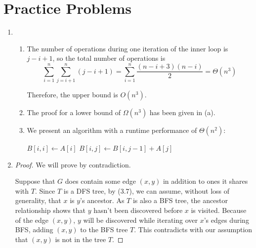 \documentclass{article}
\begin{document}
\section{Practice Problems}

\begin{enumerate}
    \item
    \begin{enumerate}
        \item The number of operations during one iteration of the inner loop is $j - i + 1$, so the total number of operations is
        \[
            \sum_{i = 1}^n \sum_{j = i + 1}^n (j - i + 1) = \sum_{i = 1}^n \frac{(n - i + 3)(n - i)}{2} = \Theta(n^3)
        \]
        
        Therefore, the upper bound is $O(n^3)$.
        
        \item The proof for a lower bound of $\Omega(n^3)$ has been given in (a).
        \item We present an algorithm with a runtime performance of $\Theta(n^2)$:
        \begin{algorithmic}[1]
                \State $B[i, i] \gets A[i]$
                    \State $B[i, j] \gets B[i, j - 1] + A[j]$
                \EndFor
            \EndFor
        \end{algorithmic}

    \end{enumerate}
    
    \item
    \begin{proof}
        We will prove by contradiction.
        
        Suppose that $G$ does contain some edge $(x, y)$ in addition to ones it shares with $T$. Since $T$ is a DFS tree, by (3.7), we can assume, without loss of generality, that $x$ is $y$'s ancestor. As $T$ is also a BFS tree, the ancestor relationship shows that $y$ hasn't been discovered before $x$ is visited. Because of the edge $(x, y)$, $y$ will be discovered while iterating over $x$'s edges during BFS, adding $(x, y)$ to the BFS tree $T$. This contradicts with our assumption that $(x, y)$ is not in the tree $T$.
    \end{proof}
\end{enumerate}
\end{document}
